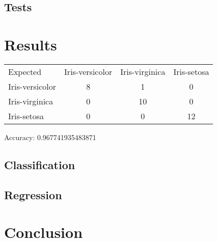 \documentclass[twocolumn]{article}
\begin{document}
\subsection{Tests}

\section{Results}

\begin{center}
\begin{tabular}{ l c c c }
Expected & Iris-versicolor & Iris-virginica & Iris-setosa \\
Iris-versicolor & 8 & 1 & 0 \\ 
Iris-virginica & 0 & 10 & 0 \\
Iris-setosa & 0 & 0 & 12
\end{tabular}
\end{center}

Accuracy: 0.967741935483871

\subsection{Classification}

\subsection{Regression}

\section{Conclusion}
\lipsum[3]

\printbibliography
\end{document}

